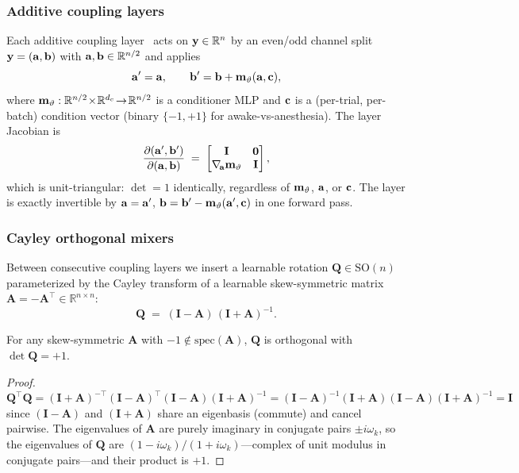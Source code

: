 \subsubsection{Additive coupling layers}\label{supp:interareal-control-additive-coupling}

Each additive coupling layer~\cite{Dinh2014-lx} acts on $\vb{y}\in\mathbb{R}^{n}$ by an even/odd channel split $\vb{y}=(\vb{a},\vb{b})$ with $\vb{a},\vb{b}\in\mathbb{R}^{n/2}$ and applies
\begin{equation}
\vb{a}' = \vb{a},\qquad \vb{b}' = \vb{b}+\vb{m}_{\vartheta}(\vb{a},\vb{c}),
\end{equation}
where $\vb{m}_{\vartheta}:\mathbb{R}^{n/2}\!\times\!\mathbb{R}^{d_{c}}\!\to\!\mathbb{R}^{n/2}$ is a conditioner MLP and $\vb{c}$ is a (per-trial, per-batch) condition vector (binary $\{-1,+1\}$ for awake-vs-anesthesia). The layer Jacobian is
\begin{equation}
\frac{\partial(\vb{a}',\vb{b}')}{\partial(\vb{a},\vb{b})} \;=\; \begin{bmatrix}\mathbf{I}&\mathbf{0}\\ \nabla_{\!\vb{a}}\vb{m}_{\vartheta}&\mathbf{I}\end{bmatrix},
\end{equation}
which is unit-triangular: $\det=1$ identically, regardless of $\vb{m}_{\vartheta}$, $\vb{a}$, or $\vb{c}$. The layer is exactly invertible by $\vb{a}=\vb{a}'$, $\vb{b}=\vb{b}'-\vb{m}_{\vartheta}(\vb{a}',\vb{c})$ in one forward pass.

\subsubsection{Cayley orthogonal mixers}\label{supp:interareal-control-cayley}

Between consecutive coupling layers we insert a learnable rotation $\mathbf{Q}\in\mathrm{SO}(n)$ parameterized by the Cayley transform of a learnable skew-symmetric matrix $\mathbf{A}=-\mathbf{A}^{\!\top}\in\mathbb{R}^{n\times n}$:
\begin{equation}
\mathbf{Q} \;=\; (\mathbf{I}-\mathbf{A})\,(\mathbf{I}+\mathbf{A})^{-1}.
\end{equation}
\begin{lemma}\label{lem:supp-interareal-control-cayley}
For any skew-symmetric $\mathbf{A}$ with $-1\notin\mathrm{spec}(\mathbf{A})$, $\mathbf{Q}$ is orthogonal with $\det\mathbf{Q}=+1$.
\end{lemma}
\begin{proof}
$\mathbf{Q}^{\!\top}\mathbf{Q}=(\mathbf{I}+\mathbf{A})^{-\top}(\mathbf{I}-\mathbf{A})^{\!\top}(\mathbf{I}-\mathbf{A})(\mathbf{I}+\mathbf{A})^{-1}=(\mathbf{I}-\mathbf{A})^{-1}(\mathbf{I}+\mathbf{A})(\mathbf{I}-\mathbf{A})(\mathbf{I}+\mathbf{A})^{-1}=\mathbf{I}$ since $(\mathbf{I}-\mathbf{A})$ and $(\mathbf{I}+\mathbf{A})$ share an eigenbasis (commute) and cancel pairwise. The eigenvalues of $\mathbf{A}$ are purely imaginary in conjugate pairs $\pm i\omega_{k}$, so the eigenvalues of $\mathbf{Q}$ are $(1-i\omega_{k})/(1+i\omega_{k})$---complex of unit modulus in conjugate pairs---and their product is $+1$.
\end{proof}

